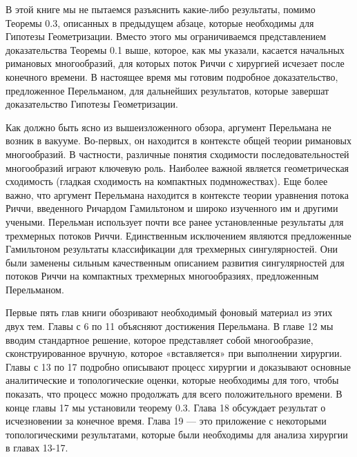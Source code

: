 В этой книге мы не пытаемся разъяснить какие-либо результаты, помимо Теоремы 0.3, 
описанных в предыдущем абзаце, которые необходимы для Гипотезы Геометризации. 
Вместо этого мы ограничиваемся представлением доказательства Теоремы 0.1 выше, 
которое, как мы указали, касается начальных римановых многообразий, для которых 
поток Риччи с хирургией исчезает после конечного времени. В настоящее время мы 
готовим подробное доказательство, предложенное Перельманом, для дальнейших 
результатов, которые завершат доказательство Гипотезы Геометризации.

Как должно быть ясно из вышеизложенного обзора, аргумент Перельмана не возник в 
вакууме. Во-первых, он находится в контексте общей теории римановых многообразий. 
В частности, различные понятия сходимости последовательностей многообразий играют 
ключевую роль. Наиболее важной является геометрическая сходимость (гладкая 
сходимость на компактных подмножествах). Еще более важно, что аргумент Перельмана 
находится в контексте теории уравнения потока Риччи, введенного Ричардом 
Гамильтоном и широко изученного им и другими учеными. Перельман использует почти 
все ранее установленные результаты для трехмерных потоков Риччи. Единственным 
исключением являются предложенные Гамильтоном результаты классификации для 
трехмерных сингулярностей. Они были заменены сильным качественным описанием 
развития сингулярностей для потоков Риччи на компактных трехмерных многообразиях, 
предложенным Перельманом.

Первые пять глав книги обозривают необходимый фоновый материал из этих двух тем. 
Главы с 6 по 11 объясняют достижения Перельмана. В главе 12 мы вводим стандартное 
решение, которое представляет собой многообразие, сконструированное вручную, 
которое «вставляется» при выполнении хирургии. Главы с 13 по 17 подробно описывают 
процесс хирургии и доказывают основные аналитические и топологические оценки, 
которые необходимы для того, чтобы показать, что процесс можно продолжать для 
всего положительного времени. В конце главы 17 мы установили теорему 0.3. Глава 18 
обсуждает результат о исчезновении за конечное время. Глава 19 — это приложение с 
некоторыми топологическими результатами, которые были необходимы для анализа 
хирургии в главах 13-17.